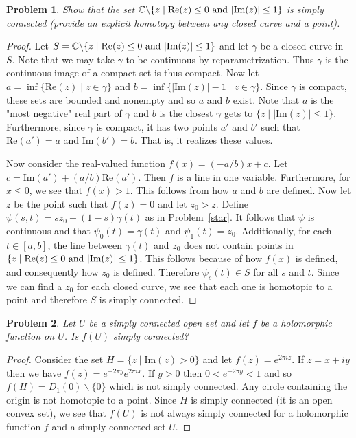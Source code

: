 \documentclass{article}
\newtheorem{problem}{Problem}
\begin{document}
\begin{problem}
Show that the set $\mathbb{C} \backslash \{z \mid \textup{Re}(z) \leq 0 \text{ and } |\textup{Im}(z)| \leq 1\}$ is simply connected (provide an explicit homotopy between any closed curve and a point).
\end{problem}
\begin{proof}
Let $S = \mathbb{C} \backslash \{z \mid \textup{Re}(z) \leq 0 \text{ and } |\textup{Im}(z)| \leq 1\}$ and let $\gamma$ be a closed curve in $S$. Note that we may take $\gamma$ to be continuous by reparametrization. Thus $\gamma$ is the continuous image of a compact set is thus compact. Now let $a = \inf \{\text{Re}(z) \mid z \in \gamma\}$ and $b = \inf \{|\text{Im}(z)| - 1 \mid z \in \gamma\}$. Since $\gamma$ is compact, these sets are bounded and nonempty and so $a$ and $b$ exist. Note that $a$ is the "most negative" real part of $\gamma$ and $b$ is the closest $\gamma$ gets to $\{z \mid |\text{Im}(z)| \leq 1\}$. Furthermore, since $\gamma$ is compact, it has two points $a'$ and $b'$ such that $\text{Re}(a') = a$ and $\text{Im}(b') = b$. That is, it realizes these values.

Now consider the real-valued function $f(x) = (-a/b)x + c$. Let $c = \text{Im}(a') + (a/b)\text{Re}(a')$. Then $f$ is a line in one variable. Furthermore, for $x \leq 0$, we see that $f(x) > 1$. This follows from how $a$ and $b$ are defined. Now let $z$ be the point such that $f(z) = 0$ and let $z_0 > z$. Define $\psi(s,t) = sz_0 + (1-s)\gamma(t)$ as in Problem~\ref{star}. It follows that $\psi$ is continuous and that $\psi_0 (t) = \gamma(t)$ and $\psi_1 (t) = z_0$. Additionally, for each $t \in [a,b]$, the line between $\gamma(t)$ and $z_0$ does not contain points in $\{z \mid \textup{Re}(z) \leq 0 \text{ and } |\textup{Im}(z)| \leq 1\}$. This follows because of how $f(x)$ is defined, and consequently how $z_0$ is defined. Therefore $\psi_s(t) \in S$ for all $s$ and $t$. Since we can find a $z_0$ for each closed curve, we see that each one is homotopic to a point and therefore $S$ is simply connected.
\end{proof}

\begin{problem}
Let $U$ be a simply connected open set and let $f$ be a holomorphic function on $U$. Is $f(U)$ simply connected?
\end{problem}
\begin{proof}
Consider the set $H = \{z \mid \text{Im}(z) > 0\}$ and let $f(z) = e^{2 \pi i z}$. If $z = x + iy$ then we have $f(z) = e^{-2 \pi y}e^{2 \pi i x}$. If $y > 0$ then $0 < e^{-2 \pi y} < 1$ and so $f(H) = D_1(0) \backslash \{0\}$ which is not simply connected. Any circle containing the origin is not homotopic to a point. Since $H$ is simply connected (it is an open convex set), we see that $f(U)$ is not always simply connected for a holomorphic function $f$ and a simply connected set $U$.
\end{proof}
\end{document}
